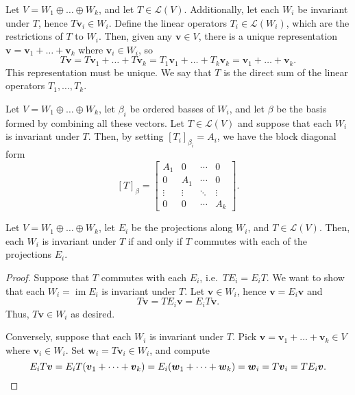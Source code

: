 \documentclass[11pt]{article}
\renewcommand{\vec}[1]{\boldsymbol{#1}}
\newcommand{\vv}{\vec{v}}
\newcommand{\vw}{\vec{w}}
\newcommand{\alg}[1]{\mathscr{#1}}
\newcommand{\algL}{\alg{L}}
\newcommand{\im}{\operatorname{im}}
\theoremstyle{definition}
\theoremstyle{remark}
\numberwithin{equation}{section}
\begin{document}
    \begin{definition}
        Let $V = W_1 \oplus \dots \oplus W_k$, and let $T \in \algL(V)$.
        Additionally, let each $W_i$ be invariant under $T$, hence $T\vv_i \in W_i$.
        Define the linear operators $T_i \in \algL(W_i)$, which are the restrictions
        of $T$ to $W_i$. Then, given any $\vv \in V$, there is a unique
        representation $\vv = \vv_1 + \dots + \vv_k$ where $\vv_i \in W_i$, so \[
            T\vv = T\vv_1 + \dots + T\vv_k = T_1\vv_1 + \dots + T_k\vv_k = \vv_1 +
            \dots + \vv_k.
        \] This representation must be unique. We say that $T$ is the direct sum of
        the linear operators $T_1, \dots, T_k$.
    \end{definition}

    \begin{lemma}
        Let $V = W_1 \oplus \dots \oplus W_k$, let $\beta_i$ be ordered basses of
        $W_i$, and let $\beta$ be the basis formed by combining all these vectors.
        Let $T \in \algL(V)$ and suppose that each $W_i$ is invariant under $T$.
        Then, by setting $[T_i]_{\beta_i} = A_i$, we have the block diagonal form \[
            [T]_\beta = \begin{bmatrix}
                A_1 & 0 & \cdots & 0 \\
                0 & A_1 & \cdots & 0 \\
                \vdots & \vdots & \ddots & \vdots \\
                0 & 0 & \cdots & A_k
            \end{bmatrix}.
        \] 
    \end{lemma}

    \begin{theorem}
        Let $V = W_1 \oplus \dots \oplus W_k$, let $E_i$ be the projections along
        $W_i$, and $T \in \algL(V)$. Then, each $W_i$ is invariant under $T$ if and
        only if $T$ commutes with each of the projections $E_i$.
    \end{theorem}
    \begin{proof}
        Suppose that $T$ commutes with each $E_i$, i.e.\ $TE_i = E_iT$. We want to
        show that each $W_i = \im{E_i}$ is invariant under $T$. Let $\vv \in W_i$,
        hence $\vv = E_i\vv$ and \[
            T\vv = TE_i\vv = E_iT\vv.
        \] Thus, $T\vv \in W_i$ as desired.

        Conversely, suppose that each $W_i$ is invariant under $T$. Pick $\vv = \vv_1
        + \dots + \vv_k \in V$ where $\vv_i \in W_i$. Set $\vw_i = T\vv_i \in W_i$,
        and compute \[
            E_iT\vv = E_iT(\vv_1 + \dots + \vv_k) = E_i(\vw_1 + \dots + \vw_k) =
            \vw_i = T\vv_i = TE_i\vv. \qedhere
        \] 
    \end{proof}
\end{document}
